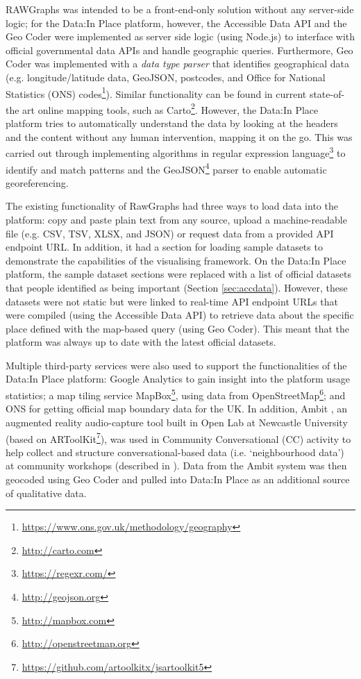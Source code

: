 RAWGraphs \citep{mauri_rawgraphs:_2017} was intended to be a front-end-only solution without any server-side logic; for the Data:In Place platform, however, the Accessible Data API and the Geo Coder were implemented as server side logic (using Node.js) to interface with official governmental data APIs and handle geographic queries. Furthermore, Geo Coder was implemented with a \textit{data type parser} that identifies geographical data (e.g. longitude/latitude data, GeoJSON, postcodes, and Office for National Statistics (ONS) codes\footnote{\url{https://www.ons.gov.uk/methodology/geography}}). Similar functionality can be found in current state-of-the art online mapping tools, such as Carto\footnote{\url{http://carto.com}}. However, the Data:In Place platform tries to automatically understand the data by looking at the headers and the content without any human intervention, mapping it on the go. This was carried out through implementing algorithms in regular expression language\footnote{\url{https://regexr.com/}} to identify and match patterns and the GeoJSON\footnote{\url{http://geojson.org}} parser to enable automatic georeferencing.

The existing functionality of RawGraphs \citep{mauri_rawgraphs:_2017} had three ways to load data into the platform: copy and paste plain text from any source, upload a machine-readable file (e.g. CSV, TSV, XLSX, and JSON) or request data from a provided API endpoint URL. In addition, it had a section for loading sample datasets to demonstrate the capabilities of the visualising framework. On the Data:In Place platform, the sample dataset sections were replaced with a list of official datasets that people identified as being important (Section \ref{sec:accdata}). However, these datasets were not static but were linked to real-time API endpoint URLs that were compiled (using the Accessible Data API) to retrieve data about the specific place defined with the map-based query (using Geo Coder). This meant that the platform was always up to date with the latest official datasets.

Multiple third-party services were also used to support the functionalities of the Data:In Place platform: Google Analytics to gain insight into the platform usage statistics; a map tiling service MapBox\footnote{\url{http://mapbox.com}}, using data from OpenStreetMap\footnote{\url{http://openstreetmap.org}}; and ONS for getting official map boundary data for the UK. In addition, Ambit \citep{johnson_creating_2020}, an augmented reality audio-capture tool built in Open Lab at Newcastle University (based on ARToolKit\footnote{\url{https://github.com/artoolkitx/jsartoolkit5}}), was used in Community Conversational (CC) \citep{johnson_community_2017} activity to help collect and structure conversational-based data (i.e. `neighbourhood data') at community workshops (described in \citet{johnson_neighbourhood_2018}). Data from the Ambit system was then geocoded using Geo Coder and pulled into Data:In Place as an additional source of qualitative data.

